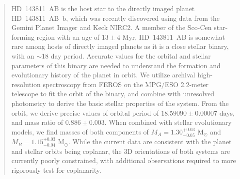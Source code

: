 \documentclass[]{aastex701} %
\begin{document}
\author[0000-0002-9156-9651]{Adam J. R. W. Smith}

\author[0000-0002-5815-7372]{Inseok Song}  

\author[0000-0003-2753-2819]{Remi Soummer}

\author[0000-0002-9121-3436]{Sandrine Thomas}

\author[0000-0002-4479-8291]{Kimberly Ward-Duong}

\author[0000-0002-9977-8255]{Schuyler G. Wolff}


\begin{abstract}


HD~143811~AB is the host star to the directly imaged planet HD~143811~AB~b, which was recently discovered using data from the Gemini Planet Imager and Keck NIRC2. A member of the Sco-Cen star-forming region with an age of $13 \pm 4$ Myr, HD~143811~AB is somewhat rare among hosts of directly imaged planets as it is a close stellar binary, with an $\sim$18 day period. Accurate values for the orbital and stellar parameters of this binary are needed to understand the formation and evolutionary history of the planet in orbit. We utilize archival high-resolution spectroscopy from FEROS on the MPG/ESO 2.2-meter telescope to fit the orbit of the binary, and combine with unresolved photometry to derive the basic stellar properties of the system. From the orbit, we derive precise values of orbital period of $18.59090 \pm 0.00007$ days, and mass ratio of $0.886 \pm 0.003$. When combined with stellar evolutionary models, we find masses of both components of $M_A = 1.30^{+0.03}_{-0.05}$ M$_\odot$ and $M_B = 1.15^{+0.03}_{-0.04}$ M$_\odot$. While the current data are consistent with the planet and stellar orbits being coplanar, the 3D orientations of both systems are currently poorly constrained, with additional observations required to more rigorously test for coplanarity.

\end{abstract}
\end{document}
